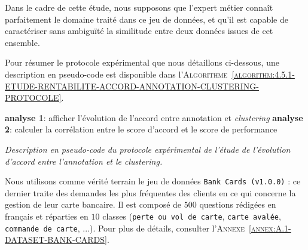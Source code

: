 			\begin{leftBarWarning}
				Dans le cadre de cette étude, nous supposons que l'expert métier connaît parfaitement le domaine traité dans ce jeu de données, et qu'il est capable de caractériser sans ambiguïté la similitude entre deux données issues de cet ensemble.
			\end{leftBarWarning}
			
			Pour résumer le protocole expérimental que nous détaillons ci-dessous, une description en pseudo-code est disponible dans l'\textsc{Algorithme~\ref{algorithm:4.5.1-ETUDE-RENTABILITE-ACCORD-ANNOTATION-CLUSTERING-PROTOCOLE}}.
			
			\begin{algorithm}
				\textbf{analyse 1}: afficher l'évolution de l'accord entre annotation et \textit{clustering} \;
				\textbf{analyse 2}: calculer la corrélation entre le score d'accord et le score de performance \;
				\caption{\textit{
					Description en pseudo-code du protocole expérimental de l'étude de l'évolution d'accord entre l'annotation et le \textit{clustering}.
				}}
				\label{algorithm:4.5.1-ETUDE-RENTABILITE-ACCORD-ANNOTATION-CLUSTERING-PROTOCOLE}
			\end{algorithm}
			
			Nous utilisons comme vérité terrain le jeu de données \texttt{Bank Cards (v1.0.0)} : ce dernier traite des demandes les plus fréquentes des clients en ce qui concerne la gestion de leur carte bancaire.
			Il est composé de $500$ questions rédigées en français et réparties en $10$ classes (\texttt{perte ou vol de carte}, \texttt{carte avalée}, \texttt{commande de carte}, ...).
			Pour plus de détails, consulter l'\textsc{Annexe~\ref{annex:A.1-DATASET-BANK-CARDS}}.
			
